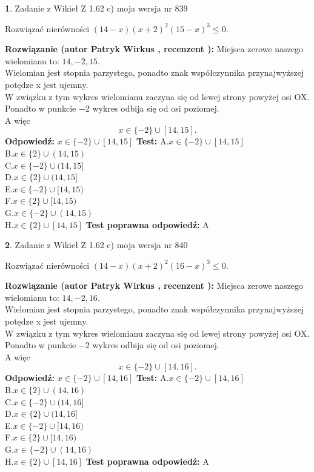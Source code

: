 \documentclass[12pt, a4paper]{article}
\theoremstyle{definition} %
\newtheorem{zad}{}
\newcommand{\zadStart}[1]{\begin{zad}#1\newline}
\newcommand{\zadStop}{\end{zad}}
\newcommand{\rozwStart}[2]{\noindent \textbf{Rozwiązanie (autor #1 , recenzent #2): }\newline}
\newcommand{\rozwStop}{\newline}
\newcommand{\odpStart}{\noindent \textbf{Odpowiedź:}\newline}
\newcommand{\odpStop}{\newline}
\newcommand{\testStart}{\noindent \textbf{Test:}\newline}
\newcommand{\testStop}{\newline}
\newcommand{\kluczStart}{\noindent \textbf{Test poprawna odpowiedź:}\newline}
\newcommand{\kluczStop}{\newline}
\begin{document}
\zadStart{Zadanie z Wikieł Z 1.62 c) moja wersja nr 839}

Rozwiązać nierówności $(14-x)(x+2)^{2}(15-x)^{3}\le0$.
\zadStop
\rozwStart{Patryk Wirkus}{}
Miejsca zerowe naszego wielomianu to: $14, -2, 15$.\\
Wielomian jest stopnia parzystego, ponadto znak współczynnika przy\linebreak najwyższej potędze x jest ujemny.\\ W związku z tym wykres wielomianu zaczyna się od lewej strony powyżej osi OX.\\
Ponadto w punkcie $-2$ wykres odbija się od osi poziomej.\\
A więc $$x \in \{-2\} \cup [14,15].$$
\rozwStop
\odpStart
$x \in \{-2\} \cup [14,15]$
\odpStop
\testStart
A.$x \in \{-2\} \cup [14,15]$\\
B.$x \in \{2\} \cup (14,15)$\\
C.$x \in \{-2\} \cup (14,15]$\\
D.$x \in \{2\} \cup (14,15]$\\
E.$x \in \{-2\} \cup [14,15)$\\
F.$x \in \{2\} \cup [14,15)$\\
G.$x \in \{-2\} \cup (14,15)$\\
H.$x \in \{2\} \cup [14,15]$
\testStop
\kluczStart
A
\kluczStop



\zadStart{Zadanie z Wikieł Z 1.62 c) moja wersja nr 840}

Rozwiązać nierówności $(14-x)(x+2)^{2}(16-x)^{3}\le0$.
\zadStop
\rozwStart{Patryk Wirkus}{}
Miejsca zerowe naszego wielomianu to: $14, -2, 16$.\\
Wielomian jest stopnia parzystego, ponadto znak współczynnika przy\linebreak najwyższej potędze x jest ujemny.\\ W związku z tym wykres wielomianu zaczyna się od lewej strony powyżej osi OX.\\
Ponadto w punkcie $-2$ wykres odbija się od osi poziomej.\\
A więc $$x \in \{-2\} \cup [14,16].$$
\rozwStop
\odpStart
$x \in \{-2\} \cup [14,16]$
\odpStop
\testStart
A.$x \in \{-2\} \cup [14,16]$\\
B.$x \in \{2\} \cup (14,16)$\\
C.$x \in \{-2\} \cup (14,16]$\\
D.$x \in \{2\} \cup (14,16]$\\
E.$x \in \{-2\} \cup [14,16)$\\
F.$x \in \{2\} \cup [14,16)$\\
G.$x \in \{-2\} \cup (14,16)$\\
H.$x \in \{2\} \cup [14,16]$
\testStop
\kluczStart
A
\kluczStop
\end{document}

